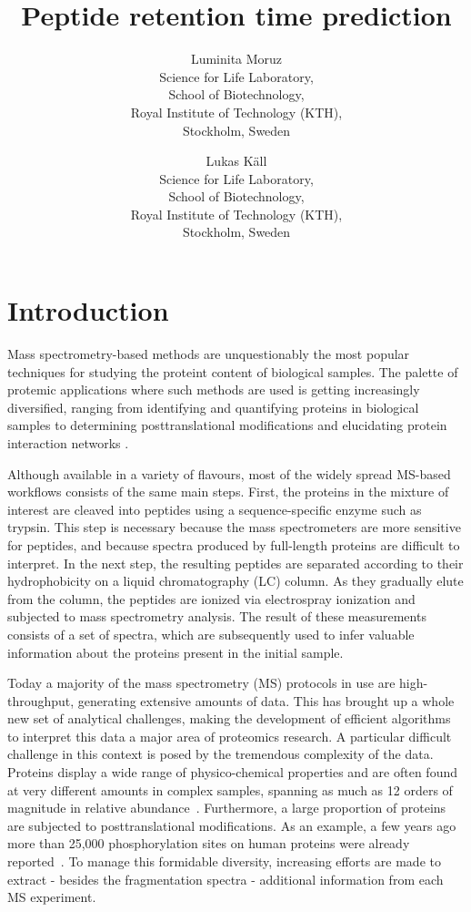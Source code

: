 \documentclass[a4paper]{article}
\title{Peptide retention time prediction}
\author{
Luminita Moruz\\
Science for Life Laboratory,\\
School of Biotechnology,\\
Royal Institute of Technology (KTH),\\
Stockholm, Sweden
\and
Lukas K\"all\\
Science for Life Laboratory,\\
School of Biotechnology,\\
Royal Institute of Technology (KTH),\\
Stockholm, Sweden}
\begin{document}
\maketitle

\setcounter{secnumdepth}{2} %
\setcounter{tocdepth}{2}    %
\tableofcontents            %

\setlength{\parskip}{0.15cm}

\section{Introduction}

Mass spectrometry-based methods are unquestionably the most popular
techniques for studying the proteint content of biological samples.
The palette of protemic applications where such methods are used is
getting increasingly diversified, ranging from identifying and
quantifying proteins in biological samples \cite{Geiger2012} to
determining posttranslational modifications \cite{Huttlin2010} and
elucidating protein interaction networks \cite{Gavin2011}. 


Although available in a variety of flavours, most of the widely spread
MS-based workflows consists of the same main steps. First, the
proteins in the mixture of interest are cleaved into peptides using a
sequence-specific enzyme such as trypsin. This step is necessary
because the mass spectrometers are more sensitive for peptides, and
because spectra produced by full-length proteins are difficult to
interpret. In the next step, the resulting peptides are separated
according to their hydrophobicity on a liquid chromatography (LC)
column. As they gradually elute from the column, the peptides are
ionized via electrospray ionization and subjected to mass spectrometry
analysis. The result of these measurements consists of a set of
spectra, which are subsequently used to infer valuable information
about the proteins present in the initial sample.


Today a majority of the mass spectrometry (MS) protocols in use are
high-throughput, generating extensive amounts of data. This has
brought up a whole new set of analytical challenges, making the
development of efficient algorithms to interpret this data a major
area of proteomics research. A particular difficult challenge in this
context is posed by the tremendous complexity of the data. Proteins
display a wide range of physico-chemical properties and are often
found at very different amounts in complex samples, spanning as much
as 12 orders of magnitude in relative abundance~\cite{Angel2012}.
Furthermore, a large proportion of proteins are subjected to
posttranslational modifications. As an example, a few years ago more
than 25,000 phosphorylation sites on human proteins were already
reported~\cite{Lemeer2009}. To manage this formidable diversity,
increasing efforts are made to extract - besides the fragmentation
spectra - additional information from each MS experiment.
\end{document}
